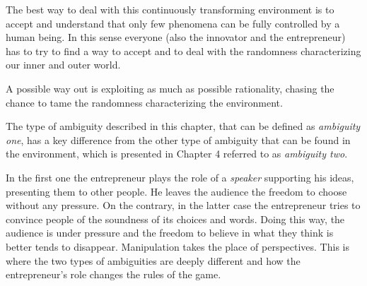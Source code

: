 The best way to deal with this continuously transforming environment is to accept and understand that only few phenomena can be fully controlled by a human being. In this sense everyone (also the innovator and the entrepreneur) has to try to find a way to accept and to deal with the randomness characterizing our inner and outer world.

A possible way out is exploiting as much as possible rationality, chasing the chance to tame the randomness characterizing the environment.

The type of ambiguity described in this chapter, that can be defined as \textit{ambiguity one}, has a key difference from the other type of ambiguity that can be found in the environment, which is presented in Chapter 4 referred to as \textit{ambiguity two}.

In the first one the entrepreneur plays the role of a \textit{speaker} supporting his ideas, presenting them to other people. He leaves the audience the freedom to choose without any pressure. On the contrary, in the latter case the entrepreneur tries to convince people of the soundness of its choices and words. Doing this way, the audience is under pressure and the freedom to believe in what they think is better tends to disappear. Manipulation takes the place of perspectives. This is where the two types of ambiguities are deeply different and how the entrepreneur’s role changes the rules of the game.
